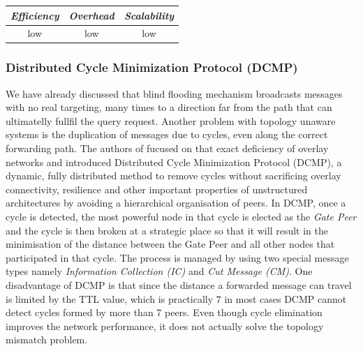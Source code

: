 \begin{center}
\begin{tabular}{ccc}
\emph{Efficiency} & \emph{Overhead} & \emph{Scalability} \\
\hline
low &
low &
low
\end{tabular}
\end{center}






\subsubsection{Distributed Cycle Minimization Protocol (DCMP)}
We have already discussed that blind flooding mechanism broadcasts messages with
no real targeting, many times to a direction far from the path that can
ultimatelly fullfil the query request. Another problem with topology unaware
systems is the duplication of messages due to cycles, even along the correct
forwarding path. The authors of \cite{zhu_dcmp_2008} fucused on that exact
deficiency of overlay networks and introduced Distributed Cycle Minimization
Protocol (DCMP), a dynamic, fully distributed method to remove cycles without
sacrificing overlay connectivity, resilience and other important properties of
unstructured architectures by avoiding a hierarchical organisation of peers. In
DCMP, once a cycle is detected, the most powerful node in that cycle is
elected as the \emph{Gate Peer} and the cycle is then broken at a strategic
place so that it will result in the minimisation of the distance between the
Gate Peer and all other nodes that participated in that cycle. The process
is managed by using two special message types namely \emph{Information
Collection (IC)} and \emph{Cut Message (CM)}. One disadvantage of DCMP is that
since the distance a forwarded message can travel is limited by the TTL value,
which is practically $7$ in most cases DCMP cannot detect cycles formed by more
than 7 peers. Even though cycle elimination improves the network performance, it
does not actually solve the topology mismatch problem.

